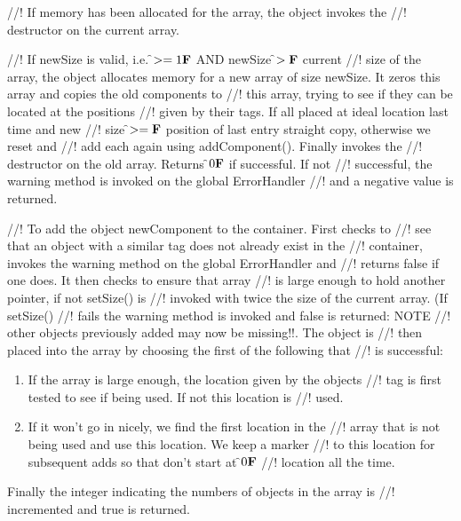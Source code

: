 //! If memory has been allocated for the array, the object invokes the
//! destructor on the current array. 

//! If \p newSize is valid, i.e. \f$>= 1{\bf F}$ AND \p newSize \f$>{\bf F}$ current
//! size of the array, the object allocates memory for a new array of size
\p newSize. It zeros this array and copies the old components to
//! this array, trying to see if they can be located at the positions
//! given by their tags. If all placed at ideal location last time and new
//! size \f$>={\bf F}$ position of last entry straight copy, otherwise we reset and
//! add each again using addComponent(). Finally invokes the
//! destructor on the old array. Returns \f$0{\bf F}$ if successful. If not
//! successful, the warning method is invoked on the global ErrorHandler
//! and a negative value is returned. 


//! To add the object \p newComponent to the container. First checks to
//! see that an object with a similar tag does not already exist in the
//! container, invokes the warning method on the global ErrorHandler and
//! returns \p false if one does. It then checks to ensure that array
//! is large enough to hold another pointer, if not setSize() is
//! invoked with twice the size of the current array. (If setSize()
//! fails the warning method is invoked and \p false is returned: NOTE
//! other objects previously added may now be missing!!. The object is
//! then placed into the array by choosing the first of the following that
//! is successful: \begin{enumerate} 
\item If the array is large enough, the location given by the objects
//! tag is first tested to see if being used. If not this location is
//! used.
\item If it won't go in nicely, we find the first location in the
//! array that is not being used and use this location. We keep a marker
//! to this location for subsequent adds so that don't start at \f$0{\bf F}$
//! location all the time.
\end{enumerate}
\noindent Finally the integer indicating the numbers of objects in the array is
//! incremented and \p true is returned.

